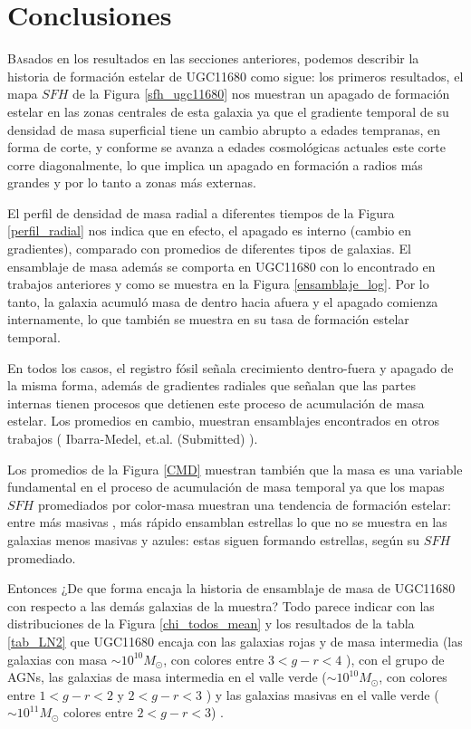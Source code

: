 \chapter{Conclusiones}


\lettrine[lines=1]{B}asados en los resultados en las secciones anteriores, podemos describir la historia de formación estelar de UGC11680 como sigue: los primeros resultados, el mapa $SFH$ de la Figura \ref{sfh_ugc11680} nos muestran un apagado de formación estelar en las zonas centrales  de esta galaxia ya que el gradiente temporal de su densidad de masa superficial tiene un cambio abrupto a edades tempranas, en forma de corte, y conforme se avanza a edades cosmológicas  actuales este corte corre diagonalmente, lo que implica un apagado en formación a radios más grandes y por lo tanto a zonas más externas.

\bigskip

\noindent El perfil de densidad de masa radial a diferentes tiempos de la Figura \ref{perfil_radial} nos indica que en efecto, el apagado es interno (cambio en gradientes), comparado con promedios de diferentes tipos de galaxias. El ensamblaje de masa además se comporta en UGC11680 con lo encontrado en trabajos anteriores \citep{perez2013} y como se muestra en la Figura \ref{ensamblaje_log}. Por lo tanto, la galaxia acumuló masa de dentro hacia afuera y el apagado comienza internamente, lo que también se muestra en su tasa de formación estelar temporal.

\bigskip

\noindent En todos los casos, el registro fósil señala crecimiento dentro-fuera y apagado de la misma forma, además de gradientes radiales que señalan que las partes internas tienen procesos que detienen este proceso de acumulación de masa estelar. Los promedios en cambio, muestran ensamblajes encontrados en otros trabajos \cite{perez2013} ({\color{red} Ibarra-Medel, et.al. (Submitted) }).

\bigskip

\noindent Los promedios de la Figura \ref{CMD} muestran también que la masa es una variable fundamental en el proceso de acumulación de masa temporal ya que los mapas  $SFH$ promediados por color-masa muestran una tendencia de formación estelar: entre más masivas , más rápido ensamblan estrellas  lo que no se muestra en las galaxias menos masivas y azules: estas siguen formando estrellas, según su $SFH$ promediado.

\bigskip


\noindent Entonces ¿De que forma encaja la historia de ensamblaje de masa de UGC11680 con respecto a las demás galaxias de la muestra? Todo parece indicar con las distribuciones de la Figura \ref{chi_todos_mean} y los resultados de la tabla \ref{tab_LN2} que UGC11680 encaja con las galaxias  rojas y de masa intermedia (las galaxias con masa  $\sim 10^{10} M_{\odot}$, con colores entre $3<g-r<4$ ), con el grupo de AGNs, las galaxias de masa intermedia en el valle verde  ($\sim 10^{10} M_{\odot}$, con colores entre $1<g-r<2$ y $2<g-r<3$ ) y  las galaxias masivas en el valle verde ($\sim 10^{11} M_{\odot}$ colores entre $2<g-r<3$) . 


